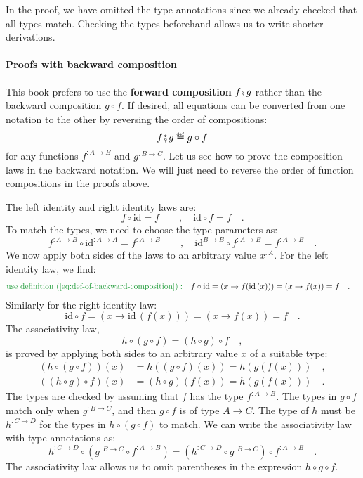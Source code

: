 In the proof, we have omitted the type annotations since we already
checked that all types match. Checking the types beforehand allows
us to write shorter derivations.

\paragraph{Proofs with backward composition}

This book prefers to use the \textbf{forward composition}
$f\bef g$ rather than the backward composition
$g\circ f$. If desired, all equations can be converted from one notation
to the other by reversing the order of compositions:
\[
f\bef g\triangleq g\circ f
\]
for any functions $f^{:A\rightarrow B}$ and $g^{:B\rightarrow C}$.
Let us see how to prove the composition laws in the backward notation.
We will just need to reverse the order of function compositions in
the proofs above.

The left identity and right identity laws are:
\[
f\circ\text{id}=f\quad\quad,\quad\text{id}\circ f=f\quad.
\]
To match the types, we need to choose the type parameters as:
\[
f^{:A\rightarrow B}\circ\text{id}^{:A\rightarrow A}=f^{:A\rightarrow B}\quad\quad,\quad\text{id}^{B\rightarrow B}\circ f^{:A\rightarrow B}=f^{:A\rightarrow B}\quad.
\]
We now apply both sides of the laws to an arbitrary value $x^{:A}$.
For the left identity law, we find:
\begin{align*}
{\color{greenunder}\text{use definition~(\ref{eq:def-of-backward-composition})}:}\quad & f\circ\text{id}=\left(x\rightarrow f(\text{id}\,(x))\right)=\left(x\rightarrow f(x)\right)=f\quad.
\end{align*}
Similarly for the right identity law:
\[
\text{id}\circ f=\left(x\rightarrow\text{id}\,(f(x))\right)=\left(x\rightarrow f\left(x\right)\right)=f\quad.
\]
The associativity law,
\[
h\circ\left(g\circ f\right)=\left(h\circ g\right)\circ f\quad,
\]
is proved by applying both sides to an arbitrary value $x$ of a suitable
type:
\begin{align*}
\left(h\circ\left(g\circ f\right)\right)(x) & =h\left(\left(g\circ f\right)(x)\right)=h\left(g\left(f\left(x\right)\right)\right)\quad,\\
\left(\left(h\circ g\right)\circ f\right)(x) & =\left(h\circ g\right)\left(f(x)\right)=h\left(g\left(f\left(x\right)\right)\right)\quad.
\end{align*}
The types are checked by assuming that $f$ has the type $f^{:A\rightarrow B}$.
The types in $g\circ f$ match only when $g^{:B\rightarrow C}$, and
then $g\circ f$ is of type $A\rightarrow C$. The type of $h$ must
be $h^{:C\rightarrow D}$ for the types in $h\circ\left(g\circ f\right)$
to match. We can write the associativity law with type annotations
as:
\begin{equation}
h^{:C\rightarrow D}\circ(g^{:B\rightarrow C}\circ f^{:A\rightarrow B})=(h^{:C\rightarrow D}\circ g^{:B\rightarrow C})\circ f^{:A\rightarrow B}\quad.\label{eq:assoc-law-for-composition-with-types-backward}
\end{equation}
The associativity law allows us to omit parentheses in the expression
$h\circ g\circ f$. 

